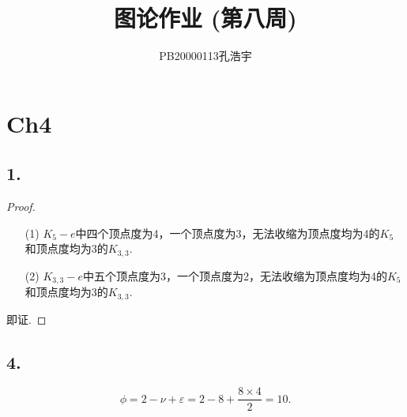 \documentclass{article}
\title{图论作业 (第八周)}
\author{PB20000113孔浩宇}
\begin{document}
\maketitle
\section*{Ch4}
\subsection*{1.}
    \begin{proof}
        \begin{enumerate}
            \item []
            \item [(1)]$K_5 -e$中四个顶点度为4，一个顶点度为3，无法收缩为顶点度均为4的$K_5$和顶点度均为3的$K_{3,3}$.
            \item [(2)]$K_{3,3} -e$中五个顶点度为3，一个顶点度为2，无法收缩为顶点度均为4的$K_5$和顶点度均为3的$K_{3,3}$.
        \end{enumerate}
        即证.
    \end{proof}

\subsection*{4.}
    \[
        \phi =2-\nu+\varepsilon=2-8+\displaystyle{\frac{8\times 4}{2}}=10.
    \]
\end{document}
